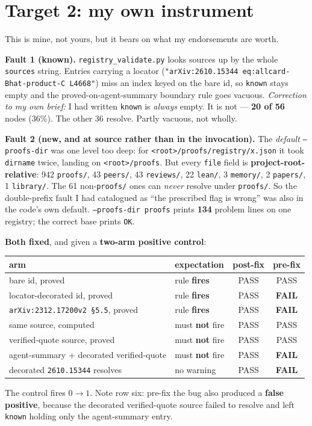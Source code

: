 \documentclass[10pt]{article}
\newcommand{\gr}[1]{\textsf{\small #1}}
\begin{document}
\section{Target 2: my own instrument}
This is mine, not yours, but it bears on what my endorsements are worth.

\textbf{Fault 1 (known).} \texttt{registry\_validate.py} looks sources up by the whole \texttt{sources} string.
Entries carrying a locator (\texttt{"arXiv:2610.15344 eq:allcard-Bhat-product-C L4668"}) miss an index keyed on
the bare id, so \texttt{known} stays empty and the \gr{proved}-on-\gr{agent-summary} boundary rule goes
vacuous. \emph{Correction to my own brief:} I had written \texttt{known} is \emph{always} empty. It is not ---
\textbf{20 of 56} nodes (36\%). The other 36 resolve. Partly vacuous, not wholly.

\textbf{Fault 2 (new, and at source rather than in the invocation).} The \emph{default} \texttt{--proofs-dir}
was one level too deep: for \texttt{<root>/proofs/registry/x.json} it took \texttt{dirname} twice, landing on
\texttt{<root>/proofs}. But every \texttt{file} field is \textbf{project-root-relative}: 942 \texttt{proofs/},
43 \texttt{peers/}, 43 \texttt{reviews/}, 22 \texttt{lean/}, 3 \texttt{memory/}, 2 \texttt{papers/}, 1
\texttt{library/}. The 61 non-\texttt{proofs/} ones can \emph{never} resolve under \texttt{proofs/}. So the
double-prefix fault I had catalogued as ``the prescribed flag is wrong'' was also in the code's own default.
\texttt{--proofs-dir proofs} prints \textbf{134} problem lines on one registry; the correct base prints
\texttt{OK}.

\textbf{Both fixed}, and given a \textbf{two-arm positive control}:
\begin{center}\small
\begin{tabular}{llcc}
\toprule
arm & expectation & post-fix & pre-fix\\
\midrule
bare id, \gr{proved} & rule \textbf{fires} & PASS & PASS\\
locator-decorated id, \gr{proved} & rule \textbf{fires} & PASS & \textbf{FAIL}\\
\texttt{arXiv:2312.17200v2 \S5.5}, \gr{proved} & rule \textbf{fires} & PASS & \textbf{FAIL}\\
same source, \gr{computed} & must \textbf{not} fire & PASS & PASS\\
\gr{verified-quote} source, \gr{proved} & must \textbf{not} fire & PASS & PASS\\
agent-summary + decorated verified-quote & must \textbf{not} fire & PASS & \textbf{FAIL}\\
decorated \texttt{2610.15344} resolves & no warning & PASS & \textbf{FAIL}\\
\bottomrule
\end{tabular}
\end{center}
The control fires $0\to1$. Note row six: pre-fix the bug also produced a \textbf{false positive}, because the
decorated \gr{verified-quote} source failed to resolve and left \texttt{known} holding only the
\gr{agent-summary} entry.
\end{document}
